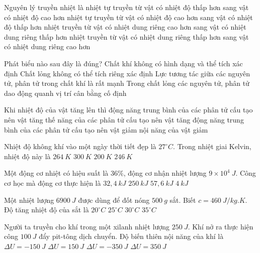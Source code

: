 \begin{ex} %
	Nguyên lý truyền nhiệt là
	\choice
	{nhiệt tự truyền từ vật có nhiệt độ thấp hơn sang vật có nhiệt độ cao hơn}
	{\True nhiệt tự truyền từ vật có nhiệt độ cao hơn sang vật có nhiệt độ thấp hơn}
	{nhiệt truyền từ vật có nhiệt dung riêng cao hơn sang vật có nhiệt dung riêng thấp hơn}
	{nhiệt truyền từ vật có nhiệt dung riêng thấp hơn sang vật có nhiệt dung riêng cao hơn}
	\loigiai{}
\end{ex}

\begin{ex} %
	Phát biểu nào sau đây là đúng?
	\choice
	{\True Chất khí không có hình dạng và thể tích xác định}
	{Chất lỏng không có thể tích riêng xác định}
	{Lực tương tác giữa các nguyên tử, phân tử trong chất khí là rất mạnh}
	{Trong chất lỏng các nguyên tử, phân tử dao động quanh vị trí cân bằng cố định}
	\loigiai{}
\end{ex}

\begin{ex} %
	Khi nhiệt độ của vật tăng lên thì
	\choice
	{\True động năng trung bình của các phân tử cấu tạo nên vật tăng}
	{thế năng của các phân tử cấu tạo nên vật tăng}
	{động năng trung bình của các phân tử cấu tạo nên vật giảm}
	{nội năng của vật giảm}
	\loigiai{}
\end{ex}

\begin{ex} %
	Nhiệt độ không khí vào một ngày thời tiết đẹp là $27^\circ C$. Trong nhiệt giai Kelvin, nhiệt độ này là
	\choice
	{$264\ K$}
	{\True $300\ K$}
	{$200\ K$}
	{$246\ K$}
	\loigiai{}
\end{ex}

\begin{ex} %
	Một động cơ nhiệt có hiệu suất là $36\%$, động cơ nhận nhiệt lượng $9 \times 10^4\ J$. Công cơ học mà động cơ thực hiện là
	\choice
	{\True $32,4\ kJ$}
	{$250\ kJ$}
	{$57,6\ kJ$}
	{$4\ kJ$}
	\loigiai{}
\end{ex}

\begin{ex} %
	Một nhiệt lượng $6900\ J$ được dùng để đốt nóng $500\ g$ sắt.  Biết $c = 460\ J/kg.K$. Độ tăng nhiệt độ của sắt là
	\choice
	{$20^\circ C$}
	{$25^\circ C$}
	{\True $30^\circ C$}
	{$35^\circ C$}
	\loigiai{}
\end{ex}

\begin{ex} %
	Người ta truyền cho khí trong một xilanh nhiệt lượng $250\ J$. Khí nở ra thực hiện công $100\ J$ đẩy pit-tông dịch chuyển. Độ biến thiên nội năng của khí là
	\choice
	{$\Delta U=-150\ J$}
	{\True $\Delta U=150\ J$}
	{$\Delta U=-350\ J$}
	{$\Delta U=350\ J$}
	\loigiai{}
\end{ex}

